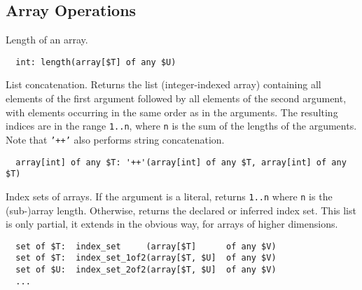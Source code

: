 \documentclass[10pt]{scrartcl}
\newcommand{\ignore}[1]{}
\begin{document}
\subsection{Array Operations}
\builtin{}
Length of an array.
\begin{verbatim}
  int: length(array[$T] of any $U)
\end{verbatim}

\builtin{}
List concatenation.  Returns the list (integer-indexed array) containing
all elements of the first argument followed by all elements of the
second argument, with elements occurring in the same order as
in the arguments.  The resulting indices are in the range \texttt{1..n},
where \texttt{n} is the sum of the lengths of the arguments.
Note that \texttt{'++'} also performs string concatenation.
\begin{verbatim}
  array[int] of any $T: '++'(array[int] of any $T, array[int] of any $T)
\end{verbatim}

\ignore{
\builtin{}
Array merge.  Does not change any indices.  If any index is repeated
in the result, it is a run-time error.  Note that it may result in an
interleaving of the elements, e.g.~the merge of \texttt{[1:1, 3:3]}
and \texttt{[2:2, 4:4]} is \texttt{[1:1, 2:2, 3:3, 4:4]}.
\begin{verbatim}
  array[$T] of any $U: merge(array[$T] of any $U, array[$T] of any $U)
\end{verbatim}
}

\builtin{}
Index sets of arrays.  If the argument is a literal, returns \texttt{1..n}
where \texttt{n} is the (sub-)array length.  Otherwise, returns the declared
or inferred index set.  This list is only partial, it extends in the obvious
way, for arrays of higher dimensions.
\begin{verbatim}
  set of $T:  index_set     (array[$T]      of any $V)
  set of $T:  index_set_1of2(array[$T, $U]  of any $V)
  set of $U:  index_set_2of2(array[$T, $U]  of any $V)
  ...
\end{verbatim}

\ignore{
\builtin{}
Get the first and last elements of an array, and the tail of an array (i.e.~all
elements except the first).  All of them abort if the array is empty.
\begin{verbatim}
  any $U:              head(array[$T] of any $U)
  any $U:              last(array[$T] of any $U)
  array[$T] of any $U: tail(array[$T] of any $U)
\end{verbatim}
}
\end{document}

